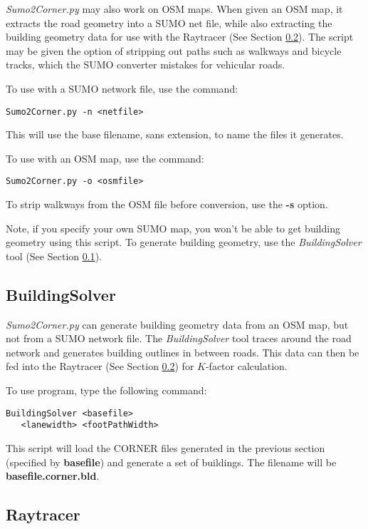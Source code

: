 \textit{Sumo2Corner.py} may also work on OSM maps. When given an OSM map, it extracts the road geometry into a SUMO net file, while also extracting the building geometry data for use with the Raytracer (See Section \ref{subsect:raytracer}). The script may be given the option of stripping out paths such as walkways and bicycle tracks, which the SUMO converter mistakes for vehicular roads.

To use with a SUMO network file, use the command:
\begin{lstlisting}[frame=single]
 Sumo2Corner.py -n <netfile>
\end{lstlisting}
This will use the base filename, sans extension, to name the files it generates.

To use with an OSM map, use the command:
\begin{lstlisting}[frame=single]
 Sumo2Corner.py -o <osmfile>
\end{lstlisting}
To strip walkways from the OSM file before conversion, use the \textbf{-s} option.

Note, if you specify your own SUMO map, you won't be able to get building geometry using this script. To generate building geometry, use the \textit{BuildingSolver} tool (See Section \ref{subsect:buildingsolver}).

\subsection{BuildingSolver}\label{subsect:buildingsolver}

\textit{Sumo2Corner.py} can generate building geometry data from an OSM map, but not from a SUMO network file. The \textit{BuildingSolver} tool traces around the road network and generates building outlines in between roads. This data can then be fed into the Raytracer (See Section \ref{subsect:raytracer}) for $K$-factor calculation.

To use program, type the following command:
\begin{lstlisting}[frame=single]
 BuildingSolver <basefile>
   <lanewidth> <footPathWidth>
\end{lstlisting}
This script will load the CORNER files generated in the previous section (specified by \textbf{basefile}) and generate a set of buildings. The filename will be \textbf{basefile.corner.bld}.

\subsection{Raytracer}\label{subsect:raytracer}

